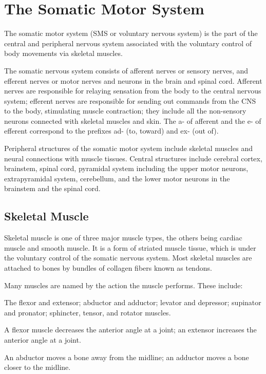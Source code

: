 \hypertarget{the-somatic-motor-system}{%
\chapter{The Somatic Motor System}\label{the-somatic-motor-system}}

The somatic motor system (SMS or voluntary nervous system) is the part of the central and peripheral nervous system associated with the voluntary control of body movements via skeletal muscles.

The somatic nervous system consists of afferent nerves or sensory nerves, and efferent nerves or motor nerves and neurons in the brain and spinal cord. Afferent nerves are responsible for relaying sensation from the body to the central nervous system; efferent nerves are responsible for sending out commands from the CNS to the body, stimulating muscle contraction; they include all the non-sensory neurons connected with skeletal muscles and skin. The a- of afferent and the e- of efferent correspond to the prefixes ad- (to, toward) and ex- (out of).

Peripheral structures of the somatic motor system include skeletal muscles and neural connections with muscle tissues. Central structures include cerebral cortex, brainstem, spinal cord, pyramidal system including the upper motor neurons, extrapyramidal system, cerebellum, and the lower motor neurons in the brainstem and the spinal cord.

\hypertarget{skeletal-muscle}{%
\section{Skeletal Muscle}\label{skeletal-muscle}}

Skeletal muscle is one of three major muscle types, the others being cardiac muscle and smooth muscle. It is a form of striated muscle tissue, which is under the voluntary control of the somatic nervous system. Most skeletal muscles are attached to bones by bundles of collagen fibers known as tendons.

Many muscles are named by the action the muscle performs. These include:

The flexor and extensor; abductor and adductor; levator and depressor; supinator and pronator; sphincter, tensor, and rotator muscles.

A flexor muscle decreases the anterior angle at a joint; an extensor increases the anterior angle at a joint.

An abductor moves a bone away from the midline; an adductor moves a bone closer to the midline.

